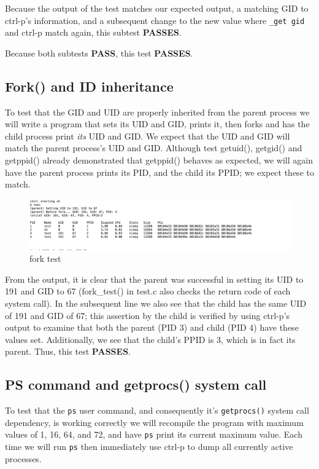 \documentclass[11pt,letterpaper]{report}
\begin{document}
	Because the output of the test matches our expected output, a matching GID to ctrl-p's information, and a subsequent change to the new value where {\tt \_get gid} and 
	ctrl-p match again, this subtest \textbf{PASSES}.


	Because both subtests \textbf{PASS}, this test \textbf{PASSES}.
	
	
	
\subsection*{Fork() and ID inheritance}	

	To test that the GID and UID are properly inherited from the parent process we will write a program that sets its UID and GID, prints it, then forks and has the child process print 
	\emph{its} UID and GID. We expect that the UID and GID will match the parent process's UID and GID. Although test getuid(), getgid() and getppid() already demonstrated that 
	getppid() behaves as expected, we will again have the parent process prints its PID, and the child its PPID; we expect these to match.


\begin{figure}[h!]
\centering
\includegraphics[width=.9\linewidth]{fork-test.png}
\caption[fork test]{fork test}
\label{fig:fork test}
\end{figure}

	From the output, it is clear that the parent was successful in setting its UID to 191 and GID to 67 (fork\_test() in test.c also checks the return code of each system call). In the 
	subsequent line we also see that the child has the same UID of 191 and GID of 67; this assertion by the child is verified by using ctrl-p's output to examine that both the parent
	(PID 3) and child (PID 4) have these values set. Additionally, we see that the child's PPID is 3, which is in fact its parent. Thus, this test \textbf{PASSES}.
	

\subsection*{PS command and getprocs() system call}	
	To test that the {\tt ps} user command, and consequently it's {\tt getprocs()} system call dependency,
	 is working correctly we will recompile the program with maximum values of 1, 16, 64, and 72, and have {\tt ps} print its current maximum
	value. Each time we will run {\tt ps} then immediately use ctrl-p to dump all currently active processes. 
	
\end{document}
